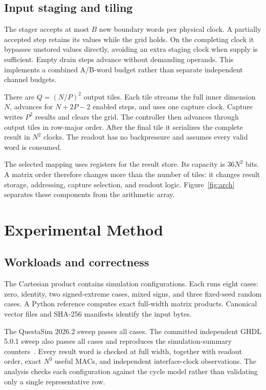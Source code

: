 \documentclass[conference]{IEEEtran}
\begin{document}
\subsection{Input staging and tiling}
The stager accepts at most $B$ new boundary words per physical clock. A partially accepted step retains its values while the grid holds. On the completing clock it bypasses unstored values directly, avoiding an extra staging clock when supply is sufficient. Empty drain steps advance without demanding operands. This implements a combined A/B-word budget rather than separate independent channel budgets.

There are $Q=(N/P)^2$ output tiles. Each tile streams the full inner dimension $N$, advances for $N+2P-2$ enabled steps, and uses one capture clock. Capture writes $P^2$ results and clears the grid. The controller then advances through output tiles in row-major order. After the final tile it serializes the complete result in $N^2$ clocks. The readout has no backpressure and assumes every valid word is consumed.

The selected mapping uses registers for the result store. Its capacity is $36N^2$ bits. A matrix order therefore changes more than the number of tiles: it changes result storage, addressing, capture selection, and readout logic. Figure~\ref{fig:arch} separates these components from the arithmetic array.

\section{Experimental Method}
\subsection{Workloads and correctness}
The Cartesian product contains \SimulationConfigurations{} simulation configurations. Each runs eight cases: zero, identity, two signed-extreme cases, mixed signs, and three fixed-seed random cases. A Python reference computes exact full-width matrix products. Canonical vector files and SHA-256 manifests identify the input bytes.

The QuestaSim 2026.2 sweep passes all \SimulationCases{} cases. The committed independent GHDL 5.0.1 sweep also passes all cases and reproduces the simulation-summary counters~\cite{ghdl}. Every result word is checked at full width, together with readout order, exact $N^3$ useful MACs, and independent interface-clock observations. The analysis checks each configuration against the cycle model rather than validating only a single representative row.
\end{document}
